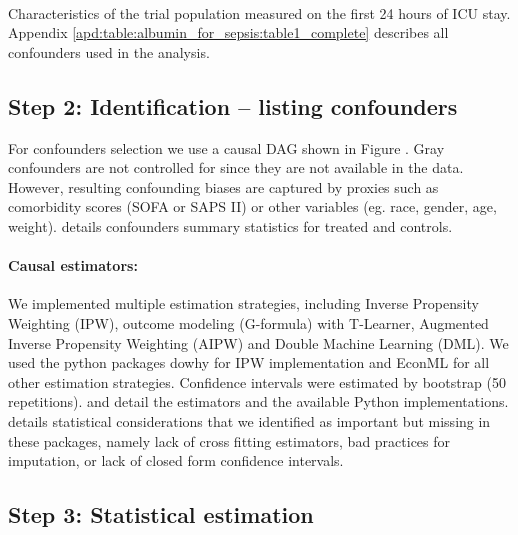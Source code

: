 \documentclass[10pt,letterpaper]{article}
\begin{document}
\begin{table}[h!]
  \centering\small
  \resizebox{\columnwidth}{!}{
  }
  \\[.5ex]

  \caption{Characteristics of the trial population measured on the first 24
    hours of ICU stay. Appendix \ref{apd:table:albumin_for_sepsis:table1_complete}
    describes all confounders used in the analysis.}\label{table:albumin_for_sepsis:table1_simple}
\end{table}


\subsection*{Step 2: Identification -- listing confounders}\label{sec:identification_mimic_iv}

For confounders selection we use a causal DAG shown in Figure
. Gray confounders are not controlled for since
they are not available in the data. However, resulting confounding biases are
captured by proxies such as comorbidity scores (SOFA or SAPS II) or other
variables (eg. race, gender, age, weight).
%
 details confounders
summary statistics for treated and controls.


\paragraph{Causal estimators:}

We implemented multiple estimation strategies, including Inverse Propensity
Weighting (IPW), outcome modeling (G-formula) with T-Learner, Augmented Inverse
Propensity Weighting (AIPW) and Double Machine Learning (DML). We used the
python packages dowhy \cite{sharma2018tutorial} for IPW implementation and
EconML \cite{battocchi2019econml} for all other estimation strategies.
Confidence intervals were estimated by bootstrap (50 repetitions).
 and
 detail the estimators and the available Python
implementations.  details statistical considerations that we identified as important but missing in these packages, namely lack of cross fitting estimators, bad practices for imputation, or lack of closed form confidence intervals.

\subsection*{Step 3: Statistical estimation}\label{sec:estimation_mimic_iv}
\end{document}
